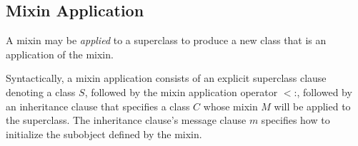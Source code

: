 \documentclass{article}
\newcommand{\code}[1]{{\sf #1}}
\begin{document}
%
%
%
%
%

\subsection{Mixin Application}
\label{mixinApplication}

A mixin may be {\em applied} to a  superclass to produce a new class that is an application of the mixin. 

Syntactically, a mixin application consists of an explicit superclass clause denoting a class $S$, followed by the
mixin application operator \code{$<$:},  followed by an inheritance clause that
specifies a class $C$ whose mixin $M$ will be applied to the superclass. The inheritance clause's message clause $m$  specifies how to initialize the
subobject defined by the mixin.


 
\end{document}
